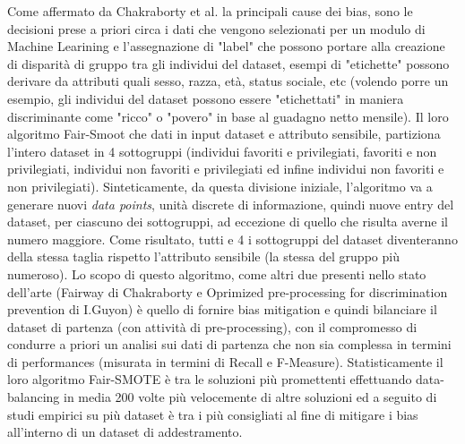 Come affermato da Chakraborty et al.\cite{biasInML}  la principali cause dei bias, sono le decisioni prese a priori circa i dati che vengono selezionati per un modulo di Machine Learining e l'assegnazione di "label" che possono portare alla creazione di disparità di gruppo tra gli individui del dataset, esempi di "etichette" possono derivare da attributi quali sesso, razza, età, status sociale, etc (volendo porre un esempio, gli individui del dataset possono essere "etichettati" in maniera discriminante come "ricco" o "povero" in base al guadagno netto mensile). Il loro algoritmo Fair-Smoot che dati in input dataset e attributo sensibile, partiziona l'intero dataset in 4 sottogruppi (individui favoriti e privilegiati, favoriti e non privilegiati, individui non favoriti e privilegiati ed infine individui non favoriti e non privilegiati). Sinteticamente, da questa divisione iniziale, l'algoritmo va a generare nuovi \emph{data points}, unità discrete di informazione, quindi nuove entry del dataset, per ciascuno dei sottogruppi, ad eccezione di quello che risulta averne il numero maggiore. Come risultato, tutti e 4 i sottogruppi del dataset diventeranno della stessa taglia rispetto l'attributo sensibile (la stessa del gruppo più numeroso). Lo scopo di questo algoritmo, come altri due presenti nello stato dell'arte (Fairway di Chakraborty e Oprimized pre-processing for discrimination prevention di I.Guyon) è quello di fornire bias mitigation e quindi bilanciare il dataset di partenza (con attività di pre-processing), con il compromesso di condurre a priori un analisi sui dati di partenza che non sia complessa in termini di performances (misurata in termini di Recall e F-Measure). Statisticamente il loro algoritmo Fair-SMOTE è tra le soluzioni più promettenti effettuando data-balancing in media 200 volte più velocemente di altre soluzioni ed a seguito di studi empirici su più dataset è tra i più consigliati al fine di mitigare i bias all'interno di un dataset di addestramento.

